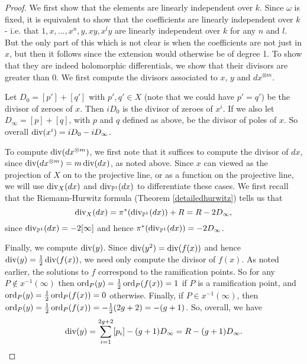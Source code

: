 \begin{proof}
We first show that the elements are linearly independent over $k$.
Since $\omega$ is fixed, it is equivalent to show that the coefficients are linearly independent over $k$ - i.e. that $1,x,\ldots ,x^n, y, xy, x^ly$ are linearly independent over $k$ for any $n$ and $l$.
But the only part of this which is not clear is when the coefficients are not just in $x$, but then it follows since the extension would otherwise be of degree 1.
To show that they are indeed holomorphic differentials, we show that their divisors are greater than $0$.
We first compute the divisors associated to $x$, $y$ and $dx^{\otimes m}$.
\begin{comment}
For any $f\in K(X)$ we will denote by $(f)_0$ and $(f)_\infty$ the divisor of zeroes and divisor of poles of $f$ respectively.
In particular, 
\[
          (f)_0 := \sum_{\{P\in X|\ord_P(f)>0\}}\ord_P(f)[P],      
 \]
 and 
 \[
 (f)_\infty = \sum_{\{P\in X |\ord_P(f)<0\}} -\ord_P(f)[P].
 \]
\end{comment}

Let $D_0 = [p']+[q']$ with $p',q' \in X$ (note that we could have $p' = q'$) be the divisor of zeroes of $x$. 
Then $ i D_0$ is the divisor of zeroes of $x^i$. 
If we also let $D_\infty = [p] + [q]$, with $p$ and $q$ defined as above, be the divisor of poles of $x$. 
So overall $\operatorname{div} (x^i) = i D_0 - i D_\infty$.


To compute $\operatorname{div} (dx^{\otimes m})$, we first note that it suffices to compute the divisor of $dx$, since $\operatorname{div} (dx^{\otimes m}) =m\operatorname{div} (dx)$, as noted above.
Since $x$ can viewed as the projection of $X$ on to the projective line, or as a function on the projective line, we will use $\operatorname{div}_X (dx)$ and $\operatorname{div}_{\mathbb P^1} (dx)$ to differentiate these cases.
We first recall that the Riemann-Hurwitz formula (Theorem \ref{detailedhurwitz}) tells us that
\[
 \operatorname{div}_X (dx) = \pi^*( \operatorname{div}_{\mathbb P^1}(dx)) + R = R - 2D_{\infty},
\]
since $\operatorname{div}_{\mathbb P^1}(dx) = -2[\infty]$ and hence $\pi^* (\operatorname{div}_{\mathbb P^1}(dx)) = -2D_\infty$.

Finally, we compute $\operatorname{div} (y)$.
Since $\operatorname{div} (y^2) = \operatorname{div} (f(x))$ and hence $\operatorname{div}(y) = \frac{1}{2}\operatorname{div}(f(x))$, we need only compute the divisor of $f(x)$.
As noted earlier, the solutions to $f$ correspond to the ramification points.
So for any $P\notin x^{-1}(\infty)$ then $\operatorname{ord}_P(y) =  \frac{1}{2}\operatorname{ord}_P(f(x)) = 1$ if $P$ is a ramification point, and $\operatorname{ord}_P(y) = \frac{1}{2}\operatorname{ord}_P(f(x)) = 0$ otherwise.
Finally, if $P\in x^{-1}(\infty)$, then $\operatorname{ord}_P(y)  = \frac{1}{2}\operatorname{ord}_P(f(x)) = - \frac{1}{2} (2g+2) = -(g+1)$.
So, overall, we have 
\[
 \operatorname{div}(y) = \sum_{i=1}^{2g+2} [p_i]- (g+1)D_\infty = R - (g+1)D_{\infty}.
 \]
\begin{comment}
Firstly, since $y(p_i)= y(j(p_i)) = j^*(y)(p_i)= -y(p_i)$ for all $i$ we see that $y(p_i)=0$.
Therefore $\deg(y)_0 \geq \deg\left(\sum_{i = 1}^{2g +2} [p_i] \right) = 2g+2$.
But since $y\in \cL(D)$, we know that $\deg(y)_{\infty} \leq \deg((g+1)D) = 2g + 2$, and as $\deg(y) = \deg(y)_0 - \deg(y)_{\infty} = 0$ then $\deg(y)_0 = \deg(y)_{\infty} = 2g+2$.
So
\[
 (y)_0 = \sum_{i=1}^{2g+2} [p_i], \ (y)_{\infty} = (g+1)D_\infty.
\]
\end{comment}


\end{proof}
